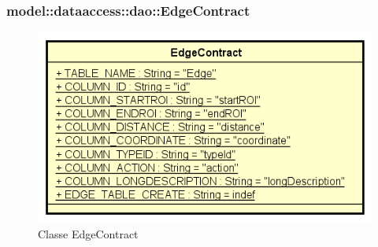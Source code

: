 \documentclass[../DefinizioneDiProdotto.tex]{subfiles}
\begin{document}
\subsubsection{model::dataaccess::dao::EdgeContract}

    \begin{figure}[H]
        \centering
        \includegraphics{img/EdgeContract.png}
        \caption{Classe EdgeContract}\label{fig:model::dataaccess::dao::EdgeContract} 
    \end{figure}
\end{document}
